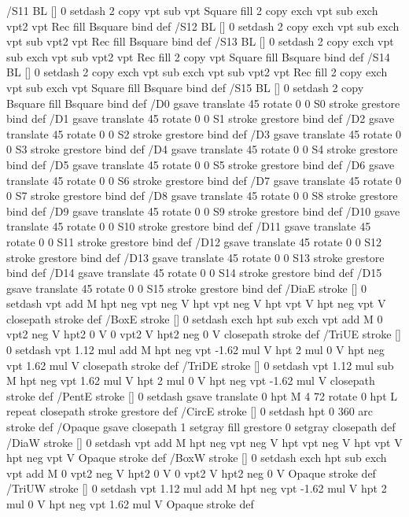 /S11 {BL [] 0 setdash 2 copy vpt sub vpt Square fill 2 copy exch vpt sub exch vpt2 vpt Rec fill
	Bsquare} bind def
/S12 {BL [] 0 setdash 2 copy exch vpt sub exch vpt sub vpt2 vpt Rec fill Bsquare} bind def
/S13 {BL [] 0 setdash 2 copy exch vpt sub exch vpt sub vpt2 vpt Rec fill
	2 copy vpt Square fill Bsquare} bind def
/S14 {BL [] 0 setdash 2 copy exch vpt sub exch vpt sub vpt2 vpt Rec fill
	2 copy exch vpt sub exch vpt Square fill Bsquare} bind def
/S15 {BL [] 0 setdash 2 copy Bsquare fill Bsquare} bind def
/D0 {gsave translate 45 rotate 0 0 S0 stroke grestore} bind def
/D1 {gsave translate 45 rotate 0 0 S1 stroke grestore} bind def
/D2 {gsave translate 45 rotate 0 0 S2 stroke grestore} bind def
/D3 {gsave translate 45 rotate 0 0 S3 stroke grestore} bind def
/D4 {gsave translate 45 rotate 0 0 S4 stroke grestore} bind def
/D5 {gsave translate 45 rotate 0 0 S5 stroke grestore} bind def
/D6 {gsave translate 45 rotate 0 0 S6 stroke grestore} bind def
/D7 {gsave translate 45 rotate 0 0 S7 stroke grestore} bind def
/D8 {gsave translate 45 rotate 0 0 S8 stroke grestore} bind def
/D9 {gsave translate 45 rotate 0 0 S9 stroke grestore} bind def
/D10 {gsave translate 45 rotate 0 0 S10 stroke grestore} bind def
/D11 {gsave translate 45 rotate 0 0 S11 stroke grestore} bind def
/D12 {gsave translate 45 rotate 0 0 S12 stroke grestore} bind def
/D13 {gsave translate 45 rotate 0 0 S13 stroke grestore} bind def
/D14 {gsave translate 45 rotate 0 0 S14 stroke grestore} bind def
/D15 {gsave translate 45 rotate 0 0 S15 stroke grestore} bind def
/DiaE {stroke [] 0 setdash vpt add M
  hpt neg vpt neg V hpt vpt neg V
  hpt vpt V hpt neg vpt V closepath stroke} def
/BoxE {stroke [] 0 setdash exch hpt sub exch vpt add M
  0 vpt2 neg V hpt2 0 V 0 vpt2 V
  hpt2 neg 0 V closepath stroke} def
/TriUE {stroke [] 0 setdash vpt 1.12 mul add M
  hpt neg vpt -1.62 mul V
  hpt 2 mul 0 V
  hpt neg vpt 1.62 mul V closepath stroke} def
/TriDE {stroke [] 0 setdash vpt 1.12 mul sub M
  hpt neg vpt 1.62 mul V
  hpt 2 mul 0 V
  hpt neg vpt -1.62 mul V closepath stroke} def
/PentE {stroke [] 0 setdash gsave
  translate 0 hpt M 4 {72 rotate 0 hpt L} repeat
  closepath stroke grestore} def
/CircE {stroke [] 0 setdash 
  hpt 0 360 arc stroke} def
/Opaque {gsave closepath 1 setgray fill grestore 0 setgray closepath} def
/DiaW {stroke [] 0 setdash vpt add M
  hpt neg vpt neg V hpt vpt neg V
  hpt vpt V hpt neg vpt V Opaque stroke} def
/BoxW {stroke [] 0 setdash exch hpt sub exch vpt add M
  0 vpt2 neg V hpt2 0 V 0 vpt2 V
  hpt2 neg 0 V Opaque stroke} def
/TriUW {stroke [] 0 setdash vpt 1.12 mul add M
  hpt neg vpt -1.62 mul V
  hpt 2 mul 0 V
  hpt neg vpt 1.62 mul V Opaque stroke} def
